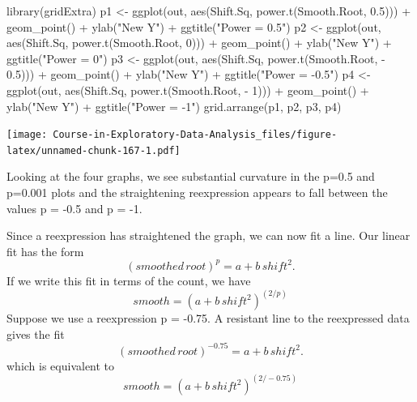 \documentclass[
]{book}
\newenvironment{Shaded}{\begin{snugshade}}{\end{snugshade}}
\newcommand{\DecValTok}[1]{\textcolor[rgb]{0.00,0.00,0.81}{#1}}
\newcommand{\FloatTok}[1]{\textcolor[rgb]{0.00,0.00,0.81}{#1}}
\newcommand{\FunctionTok}[1]{\textcolor[rgb]{0.00,0.00,0.00}{#1}}
\newcommand{\NormalTok}[1]{#1}
\newcommand{\OtherTok}[1]{\textcolor[rgb]{0.56,0.35,0.01}{#1}}
\newcommand{\SpecialCharTok}[1]{\textcolor[rgb]{0.00,0.00,0.00}{#1}}
\newcommand{\StringTok}[1]{\textcolor[rgb]{0.31,0.60,0.02}{#1}}
\begin{document}
\begin{Shaded}
\begin{Highlighting}[]
\FunctionTok{library}\NormalTok{(gridExtra)}
\NormalTok{p1 }\OtherTok{\textless{}{-}}  \FunctionTok{ggplot}\NormalTok{(out,}
      \FunctionTok{aes}\NormalTok{(Shift.Sq, }\FunctionTok{power.t}\NormalTok{(Smooth.Root, }\FloatTok{0.5}\NormalTok{))) }\SpecialCharTok{+}
      \FunctionTok{geom\_point}\NormalTok{() }\SpecialCharTok{+} \FunctionTok{ylab}\NormalTok{(}\StringTok{"New Y"}\NormalTok{) }\SpecialCharTok{+} \FunctionTok{ggtitle}\NormalTok{(}\StringTok{"Power = 0.5"}\NormalTok{)}
\NormalTok{p2 }\OtherTok{\textless{}{-}}  \FunctionTok{ggplot}\NormalTok{(out,}
      \FunctionTok{aes}\NormalTok{(Shift.Sq, }\FunctionTok{power.t}\NormalTok{(Smooth.Root, }\DecValTok{0}\NormalTok{))) }\SpecialCharTok{+}
      \FunctionTok{geom\_point}\NormalTok{() }\SpecialCharTok{+} \FunctionTok{ylab}\NormalTok{(}\StringTok{"New Y"}\NormalTok{) }\SpecialCharTok{+} \FunctionTok{ggtitle}\NormalTok{(}\StringTok{"Power = 0"}\NormalTok{)}
\NormalTok{p3 }\OtherTok{\textless{}{-}}  \FunctionTok{ggplot}\NormalTok{(out,}
      \FunctionTok{aes}\NormalTok{(Shift.Sq, }\FunctionTok{power.t}\NormalTok{(Smooth.Root, }\SpecialCharTok{{-}} \FloatTok{0.5}\NormalTok{))) }\SpecialCharTok{+}
  \FunctionTok{geom\_point}\NormalTok{() }\SpecialCharTok{+} \FunctionTok{ylab}\NormalTok{(}\StringTok{"New Y"}\NormalTok{) }\SpecialCharTok{+} \FunctionTok{ggtitle}\NormalTok{(}\StringTok{"Power = {-}0.5"}\NormalTok{)}
\NormalTok{p4 }\OtherTok{\textless{}{-}}  \FunctionTok{ggplot}\NormalTok{(out,}
      \FunctionTok{aes}\NormalTok{(Shift.Sq, }\FunctionTok{power.t}\NormalTok{(Smooth.Root, }\SpecialCharTok{{-}} \DecValTok{1}\NormalTok{))) }\SpecialCharTok{+}
      \FunctionTok{geom\_point}\NormalTok{() }\SpecialCharTok{+} \FunctionTok{ylab}\NormalTok{(}\StringTok{"New Y"}\NormalTok{) }\SpecialCharTok{+} \FunctionTok{ggtitle}\NormalTok{(}\StringTok{"Power = {-}1"}\NormalTok{)}
\FunctionTok{grid.arrange}\NormalTok{(p1, p2, p3, p4)}
\end{Highlighting}
\end{Shaded}

\texttt{[image: Course-in-Exploratory-Data-Analysis\_files/figure-latex/unnamed-chunk-167-1.pdf]}

Looking at the four graphs, we see substantial curvature in the p=0.5 and p=0.001 plots and the straightening reexpression appears to fall between the values p = -0.5 and p = -1.

Since a reexpression has straightened the graph, we can now fit a line. Our linear fit has the form
\[
(smoothed \, root)^p = a + b \, shift^2.
\]
If we write this fit in terms of the count, we have
\[
smooth = (a + b \, shift ^ 2)^{(2/p)}
\]
Suppose we use a reexpression p = -0.75. A resistant line to the reexpressed data gives the fit
\[
(smoothed \, root)^{-0.75} = a + b \, shift^2.
\]
which is equivalent to
\[
smooth = (a + b \, shift ^ 2)^{(2/-0.75)}
\]
\end{document}
